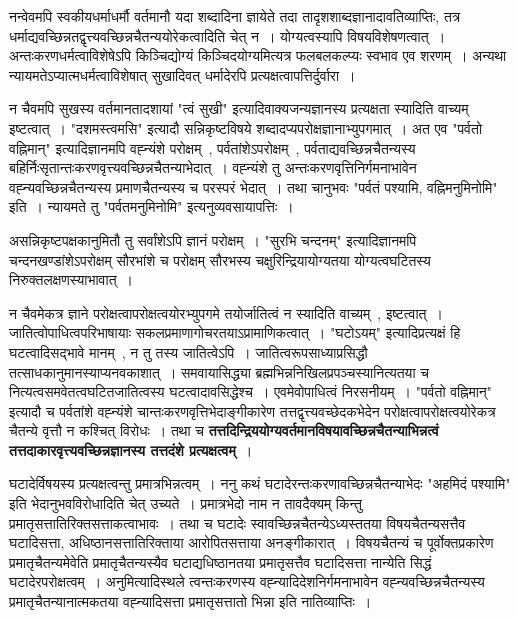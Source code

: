 	नन्वेवमपि स्वकीयधर्माधर्मौ वर्तमानौ यदा शब्दादिना ज्ञायेते तदा तादृशशाब्दज्ञानादावतिव्याप्तिः, तत्र धर्माद्यवच्छिन्नतद्वृत्त्यवच्छिन्नचैतन्ययोरेकत्वादिति चेत् न~। योग्यत्वस्यापि विषयविशेषणत्वात्~। अन्तःकरणधर्मत्वाविशेषेऽपि किञ्चिद्योग्यं किञ्चिदयोग्यमित्यत्र फलबलकल्प्यः स्वभाव एव शरणम्~। अन्यथा न्यायमतेऽप्यात्मधर्मत्वाविशेषात् सुखादिवत् धर्मादेरपि प्रत्यक्षत्वापत्तिर्दुर्वारा~।\par
	न चैवमपि सुखस्य वर्तमानतादशायां "त्वं सुखी" इत्यादिवाक्यजन्यज्ञानस्य प्रत्यक्षता स्यादिति वाच्यम् इष्टत्वात्~। "दशमस्त्वमसि" इत्यादौ सन्निकृष्टविषये शब्दादप्यपरोक्षज्ञानाभ्युपगमात्~। अत एव "पर्वतो वह्निमान्" इत्यादिज्ञानमपि वह्न्यंशे परोक्षम्~, पर्वतांशेऽपरोक्षम्~, पर्वताद्यवच्छिन्नचैतन्यस्य बहिर्निःसृतान्तःकरणवृत्त्यवच्छिन्नचैतन्याभेदात्~। वह्न्यंशे तु अन्तःकरणवृत्तिनिर्गमनाभावेन वह्न्यवच्छिन्नचैतन्यस्य प्रमाणचैतन्यस्य च परस्परं भेदात्~। तथा चानुभवः "पर्वतं पश्यामि, वह्निमनुमिनोमि" इति~। न्यायमते तु "पर्वतमनुमिनोमि" इत्यनुव्यवसायापत्तिः~।\par असन्निकृष्टपक्षकानुमितौ तु सर्वांशेऽपि ज्ञानं परोक्षम्~। "सुरभि चन्दनम्" इत्यादिज्ञानमपि चन्दनखण्डांशेऽपरोक्षम् सौरभांशे च परोक्षम् सौरभस्य चक्षुरिन्द्रियायोग्यतया योग्यत्वघटितस्य निरुक्तलक्षणस्याभावात्~।\par
	न चैवमेकत्र ज्ञाने परोक्षत्वापरोक्षत्वयोरभ्युपगमे तयोर्जातित्वं न स्यादिति वाच्यम्~, इष्टत्वात्~। जातित्वोपाधित्वपरिभाषायाः सकलप्रमाणागोचरतयाऽप्रामाणिकत्वात्~। "घटोऽयम्" इत्यादिप्रत्यक्षं हि घटत्वादिसद्भावे मानम्~, न तु तस्य जातित्वेऽपि~। जातित्वरूपसाध्याप्रसिद्धौ तत्साधकानुमानस्याप्यनवकाशात्~। समवायासिद्ध्या ब्रह्मभिन्ननिखिलप्रपञ्चस्यानित्यतया च नित्यत्वसमवेतत्वघटितजातित्वस्य घटत्वादावसिद्धेश्च~। एवमेवोपाधित्वं निरसनीयम्~। "पर्वतो वह्निमान्" इत्यादौ च पर्वतांशे वह्न्यंशे चान्तःकरणवृत्तिभेदाङ्गीकारेण तत्तद्वृत्त्यवच्छेदकभेदेन परोक्षत्वापरोक्षत्वयोरेकत्र चैतन्ये वृत्तौ न कश्चित् विरोधः~। तथा च {\bfseries तत्तदिन्द्रिययोग्यवर्तमानविषयावच्छिन्नचैतन्याभिन्नत्वं तत्तदाकारवृत्त्यवच्छिन्नज्ञानस्य तत्तदंशे प्रत्यक्षत्वम्}~।\par
	घटादेर्विषयस्य प्रत्यक्षत्वन्तु प्रमात्रभिन्नत्वम्~। ननु कथं घटादेरन्तःकरणावच्छिन्नचैतन्याभेदः "अहमिदं पश्यामि" इति भेदानुभवविरोधादिति चेत् उच्यते~। प्रमात्रभेदो नाम न तावदैक्यम् किन्तु प्रमातृसत्तातिरिक्तसत्ताकत्वाभावः~। तथा च घटादेः स्वावच्छिन्नचैतन्येऽध्यस्ततया विषयचैतन्यसत्तैव घटादिसत्ता, अधिष्ठानसत्तातिरिक्ताया आरोपितसत्ताया अनङ्गीकारात्~। विषयचैतन्यं च पूर्वोक्तप्रकारेण प्रमातृचैतन्यमेवेति प्रमातृचैतन्यस्यैव घटाद्यधिष्ठानतया प्रमातृसत्तैव घटादिसत्ता नान्येति सिद्धं घटादेरपरोक्षत्वम्~। अनुमित्यादिस्थले त्वन्तःकरणस्य वह्न्यादिदेशनिर्गमनाभावेन वह्न्यवच्छिन्नचैतन्यस्य प्रमातृचैतन्यानात्मकतया वह्न्यादिसत्ता प्रमातृसत्तातो भिन्ना इति नातिव्याप्तिः~।\par
